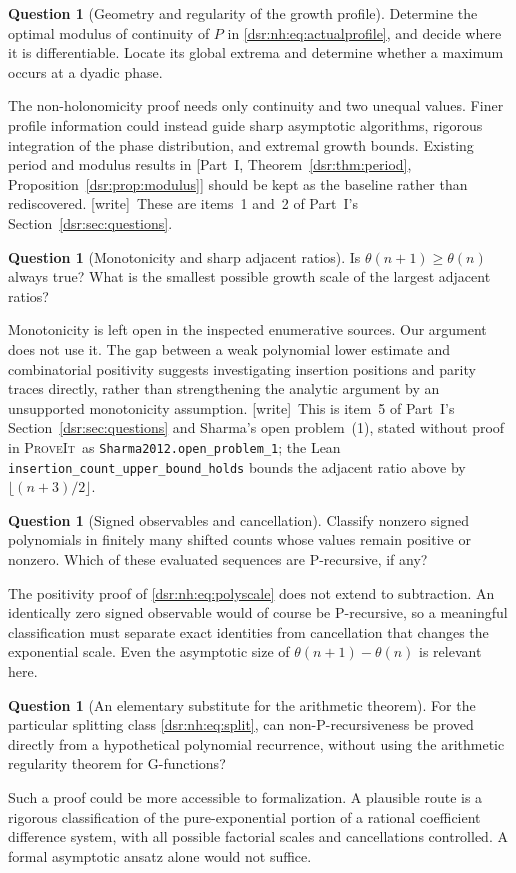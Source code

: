 \documentclass[11pt,a4paper]{article}
\numberwithin{equation}{section}
\theoremstyle{definition}
\newtheorem{question}[theorem]{Question}
\theoremstyle{remark}
\newcommand{\repo}{\textsc{ProveIt}}
\newcommand{\wtag}{\textup{[write]}}
\newcommand{\lean}[1]{\nolinkurl{#1}}
\newcommand{\tht}{\theta}
\newcommand{\partref}[1]{\textup{[}Part~I, #1\textup{]}}
\theoremstyle{definition}
\theoremstyle{plain}
\begin{document}
\begin{question}[Geometry and regularity of the growth profile]
\label{dsr:nh:q:profile}%
Determine the optimal modulus of continuity of $P$ in
\eqref{dsr:nh:eq:actualprofile}, and decide where it is differentiable. Locate its
global extrema and determine whether a maximum occurs at a dyadic phase.
\end{question}
The non-holonomicity proof needs only continuity and two unequal values.
Finer profile information could instead guide sharp asymptotic algorithms,
rigorous integration of the phase distribution, and extremal growth bounds.
Existing period and modulus results in \partref{Theorem~\ref{dsr:thm:period}, Proposition~\ref{dsr:prop:modulus}} should be kept as
the baseline rather than rediscovered.
\wtag\ These are items~1 and~2 of Part~I's Section~\ref{dsr:sec:questions}.

\begin{question}[Monotonicity and sharp adjacent ratios]
\label{dsr:nh:q:monotone}%
Is $\tht(n+1)\ge\tht(n)$ always true? What is the smallest possible growth
scale of the largest adjacent ratios?
\end{question}
Monotonicity is left open in the inspected enumerative sources. Our argument
does not use it. The gap between a weak polynomial lower estimate and
combinatorial positivity suggests investigating insertion positions and
parity traces directly, rather than strengthening the analytic argument by
an unsupported monotonicity assumption.
\wtag\ This is item~5 of Part~I's Section~\ref{dsr:sec:questions} and
Sharma's open problem~(1), stated without proof in \repo\ as
\lean{Sharma2012.open_problem_1}; the Lean
\lean{insertion_count_upper_bound_holds} bounds the adjacent ratio above
by $\lfloor(n+3)/2\rfloor$.

\begin{question}[Signed observables and cancellation]
Classify nonzero signed polynomials in finitely many shifted counts whose
values remain positive or nonzero. Which of these evaluated sequences are
P-recursive, if any?
\end{question}
The positivity proof of \eqref{dsr:nh:eq:polyscale} does not extend to subtraction.
An identically zero signed observable would of course be P-recursive, so a
meaningful classification must separate exact identities from cancellation
that changes the exponential scale. Even the asymptotic size of
$\tht(n+1)-\tht(n)$ is relevant here.

\begin{question}[An elementary substitute for the arithmetic theorem]
For the particular splitting class \eqref{dsr:nh:eq:split}, can non-P-recursiveness
be proved directly from a hypothetical polynomial recurrence, without using
the arithmetic regularity theorem for G-functions?
\end{question}
Such a proof could be more accessible to formalization. A plausible route is
a rigorous classification of the pure-exponential portion of a rational
coefficient difference system, with all possible factorial scales and
cancellations controlled. A formal asymptotic ansatz alone would not suffice.
\end{document}
